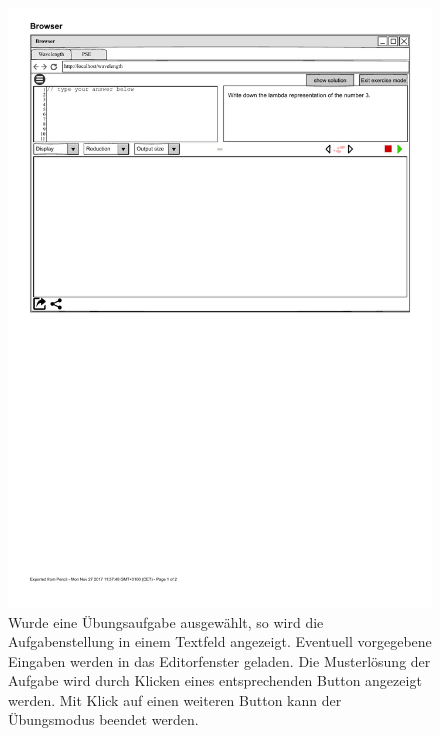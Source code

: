 \documentclass[parskip=full,11pt,twoside]{scrartcl}
\begin{document}
\begin{figure}[H]
	\centering
	\includegraphics[width=\textwidth]{img/wavelength_exerciseMode}
	\caption{\label{fig:exerciseMode} Wurde eine Übungsaufgabe ausgewählt, so wird die Aufgabenstellung in einem Textfeld angezeigt. Eventuell vorgegebene Eingaben werden in das Editorfenster geladen. Die Musterlösung der Aufgabe wird durch Klicken eines entsprechenden Button angezeigt werden. Mit Klick auf einen weiteren Button kann der Übungsmodus beendet werden.}
\end{figure}
\end{document}

